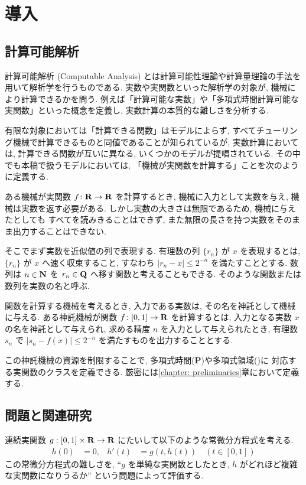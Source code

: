 \section{導入}

\subsection{計算可能解析}

計算可能解析 (Computable Analysis) とは計算可能性理論や計算量理論の手法を用いて解析学を行うものである. 
実数や実関数といった解析学の対象が, 機械により計算できるかを問う. 
例えば「計算可能な実数」や「多項式時間計算可能な実関数」といった概念を定義し, 
実数計算の本質的な難しさを分析する.

有限な対象においては「計算できる関数」はモデルによらず,
すべてチューリング機械で計算できるものと同値であることが知られているが,
実数計算においては, 計算できる関数が互いに異なる, いくつかのモデルが提唱されている.
その中でも本稿で扱うモデルにおいては,
「機械が実関数を計算する」ことを次のように定義する.

ある機械が実関数 $f \colon \mathbf R \to \mathbf R$ を計算するとき,
機械に入力として実数を与え, 機械は実数を返す必要がある.
しかし実数の大きさは無限であるため, 機械に与えたとしても
すべてを読みきることはできず,
また無限の長さを持つ実数をそのまま出力することはできない.

そこでまず実数を近似値の列で表現する.
有理数の列 $\{r_n\}$ が $x$ を表現するとは,
$\{r_n\}$ が $x$ へ速く収束すること, 
すなわち $|r_n - x| \le 2^{-n}$ を満たすこととする.
数列は $n \in \mathbf N$ を $r_n \in \mathbf Q$ へ移す関数と考えることもできる.
そのような関数または数列を実数の名と呼ぶ.

関数を計算する機械を考えるとき,
入力である実数は, その名を神託として機械に与える.
ある神託機械が関数 $f \colon [0, 1] \to \mathbf R$ を計算するとは,
入力となる実数 $x$ の名を神託として与えられ,
求める精度 $n$ を入力として与えられたとき,
有理数 $s_n$ で $|s_n - f(x)| \le 2^{-n}$ を満たすものを出力することとする.

この神託機械の資源を制限することで, 多項式時間({\bf P})や多項式領域(\PSPACE)に
対応する実関数のクラスを定義できる.
厳密には\ref{chapter: preliminaries}章において定義する.

\subsection{問題と関連研究}

連続実関数 $g : [0,1] \times \mathbf R \to \mathbf R$ にたいして以下のような常微分方程式を考える. 
\begin{align}
 \label{eq:ode}
 h(0) & = 0, &
 h'(t) & = g(t,h(t)) \quad (t \in [0,1])
\end{align}
この常微分方程式の難しさを, ``$g$ を単純な実関数としたとき, 
$h$ がどれほど複雑な実関数になりうるか'' という問題によって評価する.


